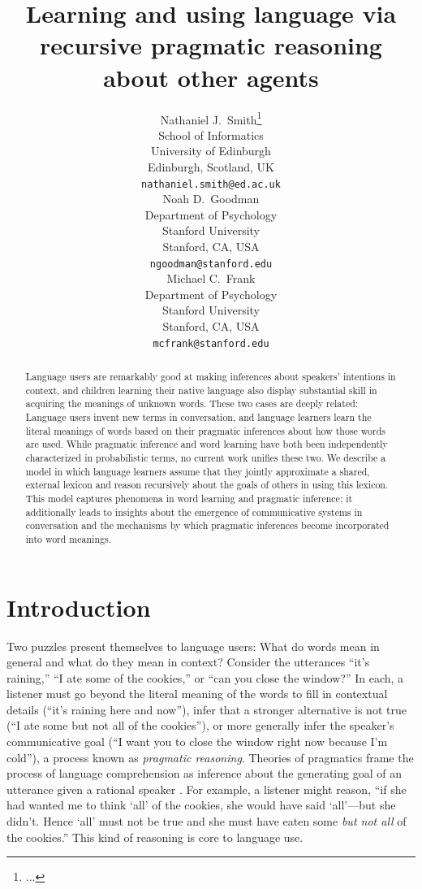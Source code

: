 \documentclass{article} %
\title{Learning and using language via recursive pragmatic reasoning
  about other agents}
\author{
Nathaniel J.~Smith\thanks{...} \\
School of Informatics\\
University of Edinburgh\\
Edinburgh, Scotland, UK\\
\texttt{nathaniel.smith@ed.ac.uk} \\
\AND
Noah D.~Goodman \\
Department of Psychology\\
Stanford University \\
Stanford, CA, USA \\
\texttt{ngoodman@stanford.edu} \\
\And
Michael C.~Frank \\
Department of Psychology \\
Stanford University \\
Stanford, CA, USA \\
\texttt{mcfrank@stanford.edu}}
\begin{document}
\maketitle

\begin{abstract}
  Language users are remarkably good at making inferences about
  speakers' intentions in context, and children learning their native
  language also display substantial skill in acquiring the
  meanings of unknown words. These two cases are deeply related:
  Language users invent new terms in conversation, and language
  learners learn the literal meanings of words based on their
  pragmatic inferences about how those words are used. 
 While pragmatic inference and word
  learning have both been independently characterized in probabilistic
  terms, no current work unifies these two. We describe a
  model in which language learners assume that they jointly
  approximate a shared, external lexicon and reason recursively about
  the goals of others in using this lexicon. This model captures
  phenomena in word learning and pragmatic inference; it additionally
  leads to insights about the emergence of communicative systems in
  conversation and the mechanisms by which pragmatic inferences become
  incorporated into word meanings.
\end{abstract}

\section{Introduction}

Two puzzles present themselves to language users: What do words mean in general and what do they mean in context?
Consider the utterances
``it's raining,'' ``I ate some of the cookies,'' or ``can you close
the window?'' In each, a listener must go beyond the literal meaning
of the words to fill in contextual details (``it's raining here and
now''), infer that a stronger alternative is not true (``I ate some
but not all of the cookies''), or more generally infer the speaker's
communicative goal (``I want you to close the window right now because
I'm cold''), a process known as \textit{pragmatic reasoning}. Theories of pragmatics frame
the process of language comprehension as inference about the
generating goal of an utterance given a rational speaker
\cite{grice1975,dale1995,frank2012}. For example, a listener might
reason, ``if she had wanted me to think `all' of the cookies, she
would have said `all'---but she didn't. Hence `all' must not be true
and she must have eaten some {\it but not all} of the cookies.'' This kind of reasoning is core to language use. 
\end{document}
